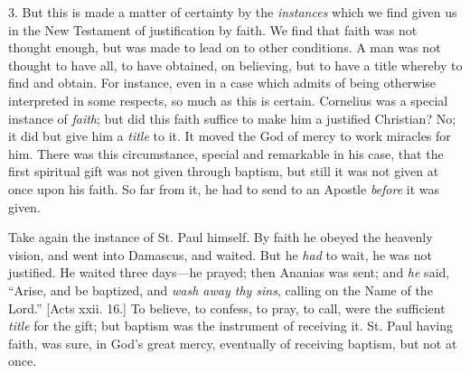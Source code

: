 3. But this is made a matter of certainty by the \emph{instances}
which we find given us in the New Testament of justification by faith.
We find that faith was not thought enough, but was made to lead on to
other conditions. A man was not thought to have all, to have obtained,
on believing, but to have a title whereby to find and obtain. For
instance, even in a case which admits of being otherwise interpreted
in some respects, so much as this is certain. Cornelius was a special
instance of \emph{faith}; but did this faith suffice to make him a
justified Christian? No; it did but give him a \emph{title} to it. It
moved the God of mercy to work miracles for him. There was this
circumstance, special and remarkable in his case, that the first
spiritual gift was not given through baptism, but still it was not
given at once upon his faith. So far from it, he had to send to an
Apostle \emph{before} it was given.

Take again the instance of St. Paul himself. By faith he obeyed the
heavenly vision, and went into Damascus, and waited. But he \emph{had}
to wait, he was not justified. He waited three days—he prayed; then
Ananias was sent; and \emph{he} said, ``Arise, and be baptized,
and \emph{wash away thy sins}, calling on the Name of the Lord.''
[Acts xxii. 16.] To believe, to confess, to pray, to call, were the
sufficient \emph{title} for the gift; but baptism was the instrument
of receiving it. St. Paul having faith, was sure, in God's great
mercy, eventually of receiving baptism, but not at once.

